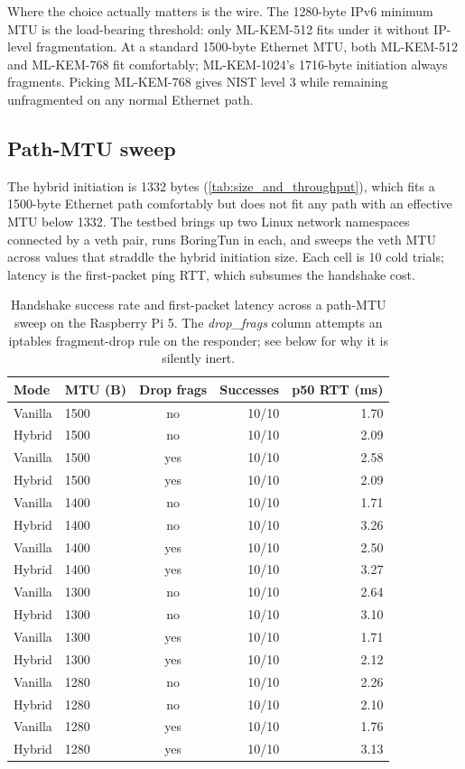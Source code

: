 \documentclass[11pt,a4paper]{article}
\begin{document}
Where the choice actually matters is the wire. The 1280-byte IPv6 minimum MTU is the load-bearing threshold: only ML-KEM-512 fits under it without IP-level fragmentation. At a standard 1500-byte Ethernet MTU, both ML-KEM-512 and ML-KEM-768 fit comfortably; ML-KEM-1024's 1716-byte initiation always fragments. Picking ML-KEM-768 gives NIST level 3 while remaining unfragmented on any normal Ethernet path.

\subsection{Path-MTU sweep}
\label{sec:eval_mtu}

The hybrid initiation is 1332 bytes (\cref{tab:size_and_throughput}), which fits a 1500-byte Ethernet path comfortably but does not fit any path with an effective MTU below 1332. The testbed brings up two Linux network namespaces connected by a veth pair, runs BoringTun in each, and sweeps the veth MTU across values that straddle the hybrid initiation size. Each cell is 10 cold trials; latency is the first-packet ping RTT, which subsumes the handshake cost.

\begin{table}[H]
\centering
\caption{Handshake success rate and first-packet latency across a path-MTU sweep on the Raspberry Pi 5. The \emph{drop\_frags} column attempts an iptables fragment-drop rule on the responder; see below for why it is silently inert.}
\label{tab:mtu_sweep}
\small
\setlength{\tabcolsep}{6pt}
\begin{tabular}{@{}llcrr@{}}
\toprule
\textbf{Mode} & \textbf{MTU (B)} & \textbf{Drop frags} & \textbf{Successes} & \textbf{p50 RTT (ms)} \\
\midrule
Vanilla & 1500 & no  & 10/10 & 1.70 \\
Hybrid  & 1500 & no  & 10/10 & 2.09 \\
Vanilla & 1500 & yes & 10/10 & 2.58 \\
Hybrid  & 1500 & yes & 10/10 & 2.09 \\
Vanilla & 1400 & no  & 10/10 & 1.71 \\
Hybrid  & 1400 & no  & 10/10 & 3.26 \\
Vanilla & 1400 & yes & 10/10 & 2.50 \\
Hybrid  & 1400 & yes & 10/10 & 3.27 \\
Vanilla & 1300 & no  & 10/10 & 2.64 \\
Hybrid  & 1300 & no  & 10/10 & 3.10 \\
Vanilla & 1300 & yes & 10/10 & 1.71 \\
Hybrid  & 1300 & yes & 10/10 & 2.12 \\
Vanilla & 1280 & no  & 10/10 & 2.26 \\
Hybrid  & 1280 & no  & 10/10 & 2.10 \\
Vanilla & 1280 & yes & 10/10 & 1.76 \\
Hybrid  & 1280 & yes & 10/10 & 3.13 \\
\bottomrule
\end{tabular}
\end{table}
\end{document}
